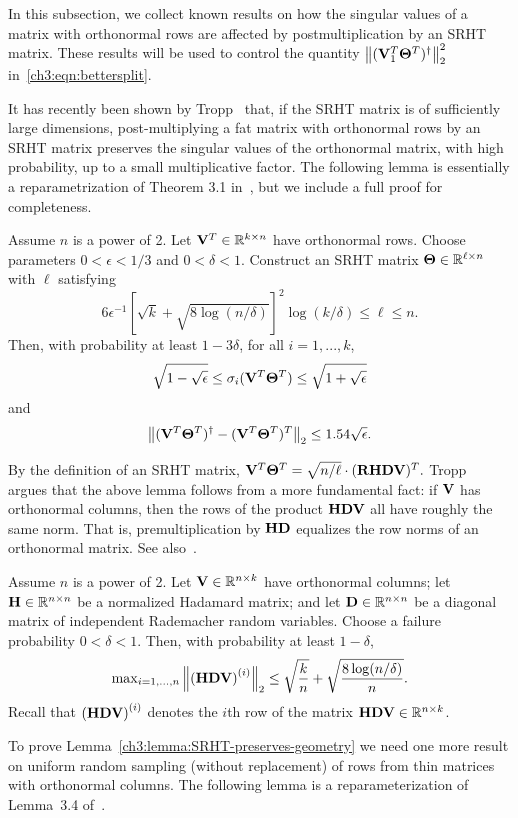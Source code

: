 In this subsection, we collect known results on how the singular values of a 
matrix with orthonormal rows are affected by postmultiplication by an SRHT 
matrix. These results will be used to control the quantity 
$\left\|(\mathbf{V}_1 ^T \mathbf{\Theta}^T)^\dagger\right\|_2^2$ in~\eqref{ch3:eqn:bettersplit}.

It has recently been shown by Tropp~\cite{Tro11} that, if the SRHT matrix 
is of sufficiently large dimensions, post-multiplying a fat matrix with 
orthonormal rows by an SRHT matrix preserves the singular values of the 
orthonormal matrix, with high probability, up to a small multiplicative 
factor. The following lemma is essentially a reparametrization of Theorem 3.1 
in~\cite{Tro11}, but we include a full proof for completeness.

\begin{lemma}
\label{ch3:lemma:SRHT-preserves-geometry}
Assume $n$ is a power of 2. Let $\mathbf{V}^T \in \mathbb{R}^{k \times n}$ have orthonormal rows. 
Choose parameters $0 < \epsilon < 1/3$ and $0 < \delta < 1.$
Construct an SRHT matrix $\mathbf{\Theta} \in \mathbb{R}^{\ell \times n}$ with $\ell$ satisfying
\begin{equation}\label{ch3:eqn:r2}
6\epsilon^{-1}\left[\sqrt{k} + \sqrt{8\log(n/\delta)} \right]^2 
 \log (k/\delta) \leq \ell \leq n.
\end{equation}
Then, with probability at least $1 - 3\delta$, for all $i=1,...,k$,
$$
\sqrt{1 - \sqrt{\epsilon}} \le \sigma_i( \mathbf{V} ^T \mathbf{\Theta}^T ) 
\le \sqrt{1 + \sqrt{\epsilon}}
$$
and
$$
\left\| (\mathbf{V}^T \mathbf{\Theta}^T)^\dagger - 
  (\mathbf{V}^T \mathbf{\Theta}^T)^T \right\|_2 \le 1.54 \sqrt{\epsilon}.
$$
\end{lemma}
%
By the definition of an SRHT matrix, $\mathbf{V}^T \mathbf{\Theta}^T = \sqrt{n/\ell} \cdot (\mathbf{R} \mathbf{H} \mathbf{D} \mathbf{V})^T.$ 
Tropp~\cite{Tro11} argues that the above lemma follows 
from a more fundamental fact: if $\mathbf{V}$ has orthonormal columns,
then the rows of the product $\mathbf{H}\mathbf{D} \mathbf{V}$ all have roughly the same 
norm. That is, premultiplication by $\mathbf{H}\mathbf{D}$
equalizes the row norms of an orthonormal matrix. See also~\cite{AC06}.

\begin{lemma}
\label{ch3:prop:SRHT-equalizes-columns-of-orthonormal-matrices}
Assume $n$ is a power of 2. Let $\mathbf{V} \in \mathbb{R}^{n \times k}$ have orthonormal columns; let 
$\mathbf{H} \in \mathbb{R}^{n \times n}$ be a normalized Hadamard matrix; and let
$\mathbf{D} \in \mathbb{R}^{n \times n}$ be a diagonal matrix of independent Rademacher random
variables. Choose a failure probability $0 < \delta < 1.$ Then, with probability at least 
$1-\delta$,
\[
\max\nolimits_{i=1,...,n} \left\|\left(\mathbf{H} \mathbf{D} \mathbf{V} \right)^{(i)}\right\|_2 \le 
 \sqrt{\frac{k}{n}}  + \sqrt{ \frac{8 \log(n/\delta)}{n}}.
\]
Recall that 
$\left(\mathbf{H} \mathbf{D}  \mathbf{V} \right)^{(i)}$ denotes the $i$th row of the matrix 
$\mathbf{H} \mathbf{D}  \mathbf{V} \in \mathbb{R}^{n \times k}$.
\end{lemma}
To prove Lemma~\ref{ch3:lemma:SRHT-preserves-geometry} we need one more result
on uniform random sampling (without replacement) of rows from thin
matrices with orthonormal columns. The following lemma is a reparameterization
of Lemma~3.4 of~\cite{Tro11}.


